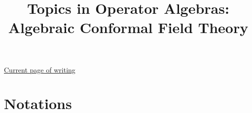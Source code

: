 \documentclass[12pt,b5paper,notitlepage]{article}
\title{Topics in Operator Algebras: Algebraic Conformal Field Theory}
\author{\sc{ Bin Gui}
}
\date{}
\theoremstyle{definition}
\theoremstyle{plain}
\numberwithin{equation}{section}
\begin{document}
\sloppy %
	\setcounter{page}{1}
	\setcounter{section}{-1}



	









	
	\maketitle












	


\normalsize

\hyperlink{beforeindex}{Current page of writing}~~~~~~ 

\tableofcontents



\newpage


\section{Notations}
\end{document}
